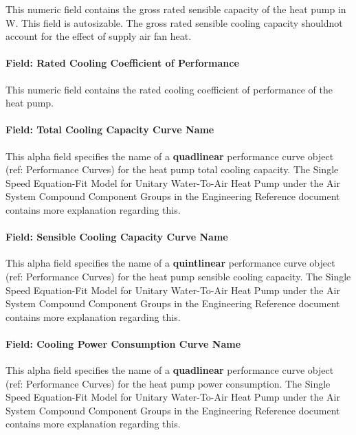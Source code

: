This numeric field contains the gross rated sensible capacity of the heat pump in W. This field is autosizable. The gross rated sensible cooling capacity shouldnot account for the effect of supply air fan heat.

\paragraph{Field: Rated Cooling Coefficient of Performance}\label{field-rated-cooling-coefficient-of-performance}

This numeric field contains the rated cooling coefficient of performance of the heat pump.

\paragraph{Field: Total Cooling Capacity Curve Name}\label{field-total-cooling-capacity-curve-name}

This alpha field specifies the name of a \textbf{quadlinear} performance curve object (ref: Performance Curves) for the heat pump total cooling capacity. The Single Speed Equation-Fit Model for Unitary Water-To-Air Heat Pump under the Air System Compound Component Groups in the Engineering Reference document contains more explanation regarding this.

\paragraph{Field: Sensible Cooling Capacity Curve Name}\label{field-sensible-cooling-capacity-curve-name}

This alpha field specifies the name of a \textbf{quintlinear} performance curve object (ref: Performance Curves) for the heat pump sensible cooling capacity. The Single Speed Equation-Fit Model for Unitary Water-To-Air Heat Pump under the Air System Compound Component Groups in the Engineering Reference document contains more explanation regarding this.

\paragraph{Field: Cooling Power Consumption Curve Name}\label{field-cooling-power-consumption-curve-name}

This alpha field specifies the name of a \textbf{quadlinear} performance curve object (ref: Performance Curves) for the heat pump power consumption. The Single Speed Equation-Fit Model for Unitary Water-To-Air Heat Pump under the Air System Compound Component Groups in the Engineering Reference document contains more explanation regarding this.

